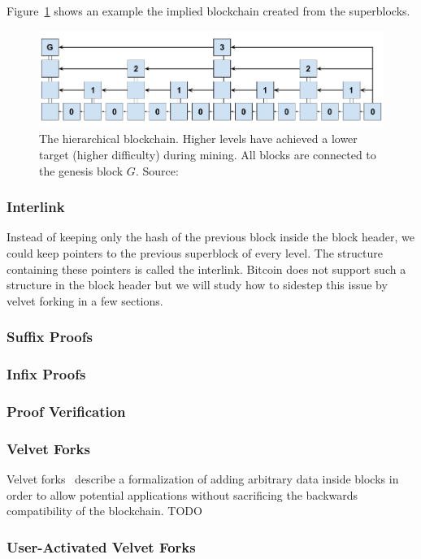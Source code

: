 \documentclass[11pt]{llncs}
\begin{document}
Figure~\ref{fig:hierarchy} shows an example the implied blockchain created from the superblocks.

\begin{figure}
  \centering
  \includegraphics[width=0.9\columnwidth,keepaspectratio]{figures/hierarchical-ledger.png}
  \caption{The hierarchical blockchain.
  Higher levels have achieved a lower target (higher difficulty) during
  mining. All blocks are connected to the genesis block $G$. Source:~\cite{nipopows}}
  \label{fig:hierarchy}
\end{figure}

\subsubsection{Interlink}
Instead of keeping only the hash of the previous block inside the block header,
we could keep pointers to the previous superblock of every level. The structure
containing these pointers is called the interlink. Bitcoin does not support
such a structure in the block header but we will study how to sidestep this
issue by velvet forking in a few sections.

\subsubsection{Suffix Proofs}
\subsubsection{Infix Proofs}
\subsubsection{Proof Verification}
\subsubsection{Velvet Forks}
Velvet forks~\cite{nipopows,velvet} describe a formalization of adding
arbitrary data inside blocks in order to allow potential applications without
sacrificing the backwards compatibility of the blockchain. TODO

\subsubsection{User-Activated Velvet Forks}
\end{document}
